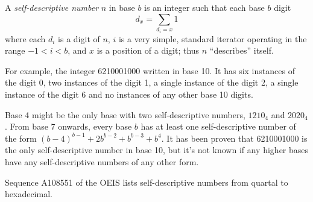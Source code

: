 \documentclass[12pt]{article}
\begin{document}
A {\em self-descriptive number} $n$ in base $b$ is an integer such that each base $b$ digit $$d_x = \sum_{d_i = x} 1$$ where each $d_i$ is a digit of $n$, $i$ is a very simple, standard iterator operating in the range $-1 < i < b$, and $x$ is a position of a digit; thus $n$ ``describes'' itself.

For example, the integer 6210001000 written in base 10. It has six instances of the digit 0, two instances of the digit 1, a single instance of the digit 2, a single instance of the digit 6 and no instances of any other base 10 digits. 

Base 4 might be the only base with two self-descriptive numbers, $1210_4$ and $2020_4$. From base 7 onwards, every base $b$ has at least one self-descriptive number of the form $(b - 4)^{b - 1} + 2b^{b - 2} + b^{b - 3} + b^4$. It has been proven that 6210001000 is the only self-descriptive number in base 10, but it's not known if any higher bases have any self-descriptive numbers of any other form.

Sequence A108551 of the OEIS lists self-descriptive numbers from quartal to hexadecimal.
\end{document}
